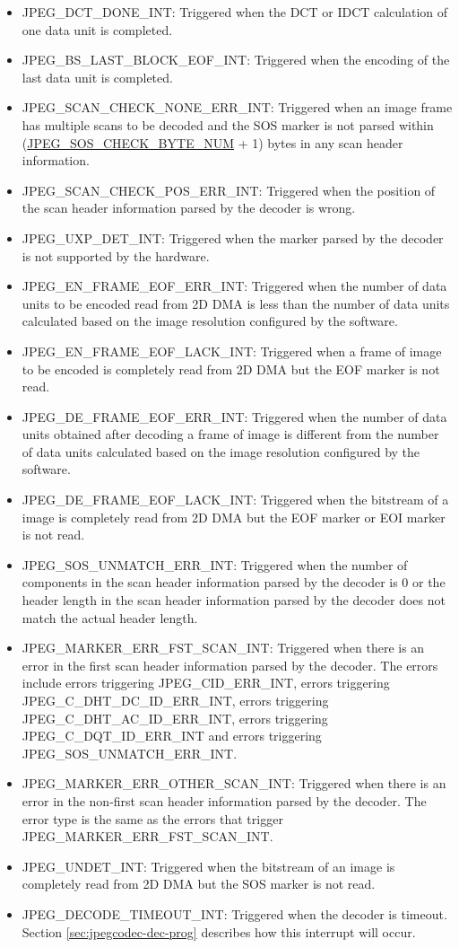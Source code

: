 \documentclass[main\_\_EN.tex]{subfiles}
\begin{document}
\begin{itemize}
\item JPEG\_DCT\_DONE\_INT: Triggered when the DCT or IDCT calculation of one data unit is completed.
\item JPEG\_BS\_LAST\_BLOCK\_EOF\_INT: Triggered when the encoding of the last data unit is completed.
\item JPEG\_SCAN\_CHECK\_NONE\_ERR\_INT: Triggered when an image frame has multiple scans to be decoded and the SOS marker is not parsed within (\hyperref[fielddesc:JPEGSOSCHECKBYTENUM]{JPEG\_SOS\_CHECK\_BYTE\_NUM} + 1) bytes in any scan header information.
\item JPEG\_SCAN\_CHECK\_POS\_ERR\_INT: Triggered when the position of the scan header information parsed by the decoder is wrong.
\item JPEG\_UXP\_DET\_INT: Triggered when the marker parsed by the decoder is not supported by the hardware.
\item JPEG\_EN\_FRAME\_EOF\_ERR\_INT: Triggered when the number of data units to be encoded read from 2D DMA is less than the number of data units calculated based on the image resolution configured by the software.
\item JPEG\_EN\_FRAME\_EOF\_LACK\_INT: Triggered when a frame of image to be encoded is completely read from 2D DMA but the EOF marker is not read.
\item JPEG\_DE\_FRAME\_EOF\_ERR\_INT: Triggered when the number of data units obtained after decoding a frame of image is different from the number of data units calculated based on the image resolution configured by the software.
\item JPEG\_DE\_FRAME\_EOF\_LACK\_INT: Triggered when the bitstream of a image is completely read from 2D DMA but the EOF marker or EOI marker is not read.
\item JPEG\_SOS\_UNMATCH\_ERR\_INT: Triggered when the number of components in the scan header information parsed by the decoder is 0 or the header length in the scan header information parsed by the decoder does not match the actual header length.
\item JPEG\_MARKER\_ERR\_FST\_SCAN\_INT: Triggered when there is an error in the first scan header information parsed by the decoder. The errors include errors triggering JPEG\_CID\_ERR\_INT, errors triggering JPEG\_C\_DHT\_DC\_ID\_ERR\_INT, errors triggering JPEG\_C\_DHT\_AC\_ID\_ERR\_INT, errors triggering JPEG\_C\_DQT\_ID\_ERR\_INT and errors triggering JPEG\_SOS\_UNMATCH\_ERR\_INT.
\item JPEG\_MARKER\_ERR\_OTHER\_SCAN\_INT: Triggered when there is an error in the non-first scan header information parsed by the decoder. The error type is the same as the errors that trigger JPEG\_MARKER\_ERR\_FST\_SCAN\_INT.
\item JPEG\_UNDET\_INT: Triggered when the bitstream of an image is completely read from 2D DMA but the SOS marker is not read.
\item JPEG\_DECODE\_TIMEOUT\_INT: Triggered when the decoder is timeout. Section \ref{sec:jpegcodec-dec-prog} describes how this interrupt will occur.
\end{itemize}
\end{document}
